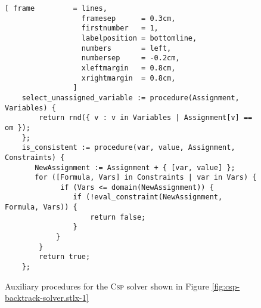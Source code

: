 \begin{figure}[!ht]
\centering
\begin{Verbatim}[ frame         = lines, 
                  framesep      = 0.3cm, 
                  firstnumber   = 1,
                  labelposition = bottomline,
                  numbers       = left,
                  numbersep     = -0.2cm,
                  xleftmargin   = 0.8cm,
                  xrightmargin  = 0.8cm,
                ]
    select_unassigned_variable := procedure(Assignment, Variables) {
        return rnd({ v : v in Variables | Assignment[v] == om });
    };
    is_consistent := procedure(var, value, Assignment, Constraints) {
       NewAssignment := Assignment + { [var, value] };
       for ([Formula, Vars] in Constraints | var in Vars) {
             if (Vars <= domain(NewAssignment)) {
                if (!eval_constraint(NewAssignment, Formula, Vars)) {
                    return false;
                }
            }
        }
        return true;
    };
\end{Verbatim}
\vspace*{-0.3cm}
\caption{Auxiliary procedures for the \textsc{Csp} solver shown in Figure \ref{fig:csp-backtrack-solver.stlx-1}}
\label{fig:csp-backtrack-solver.stlx-2}
\end{figure}

